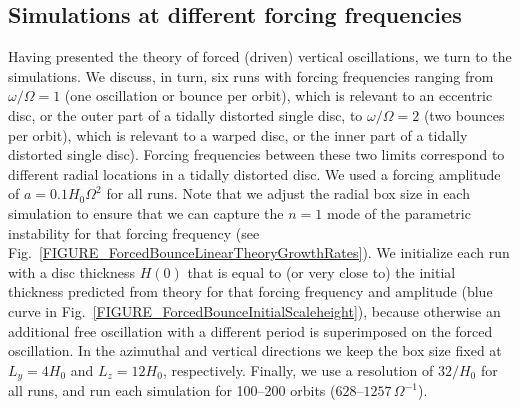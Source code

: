 \documentclass[fleqn,usenatbib]{mnras}
\begin{document}
\subsection{Simulations at different forcing frequencies}
\label{SECTION_ForcedBounceSimulations}
Having presented the theory of forced (driven) vertical oscillations, we turn to the simulations. We discuss, in turn, six runs with forcing frequencies ranging from $\omega/\Omega = 1$  (one oscillation or bounce per orbit), which is relevant to an eccentric disc, or the outer part of a tidally distorted single disc, to $\omega/\Omega = 2$ (two bounces per orbit), which is relevant to a warped disc, or the inner part of a tidally distorted single disc). Forcing frequencies between these two limits correspond to different radial locations in a tidally distorted disc. We used a forcing amplitude of $a = 0.1  H_0\Omega^2$ for all runs. Note that we adjust the radial box size in each simulation to ensure that we can capture the $n=1$ mode of the parametric instability for that forcing frequency (see Fig.~\ref{FIGURE_ForcedBounceLinearTheoryGrowthRates}). We initialize each run with a disc thickness $H(0)$ that is equal to (or very close to) the initial thickness predicted from theory for that forcing frequency and amplitude (blue curve in Fig.~\ref{FIGURE_ForcedBounceInitialScaleheight}), because otherwise an additional free oscillation with a different period is superimposed on the forced oscillation. In the azimuthal and vertical directions we keep the box size fixed at $L_y = 4H_0$ and $L_z = 12H_0$, respectively. Finally, we use a resolution of $32/H_0$ for all runs, and run each simulation for 100--200 orbits ($628$--$1257\,\Omega^{-1}$).
\end{document}
